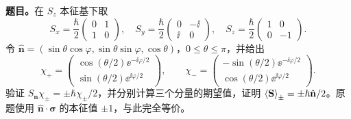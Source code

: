 \textbf{题目。}在 $S_z$ 本征基下取
\begin{equation}
  S_x=\frac\hbar2\begin{pmatrix}0&1\\1&0\end{pmatrix},\quad
  S_y=\frac\hbar2\begin{pmatrix}0&-\ii\\\ii&0\end{pmatrix},\quad
  S_z=\frac\hbar2\begin{pmatrix}1&0\\0&-1\end{pmatrix}.
\end{equation}
令 $\hat{\mathbf n}=(\sin\theta\cos\varphi,\sin\theta\sin\varphi,\cos\theta)$，$0\le\theta\le\pi$，并给出
\begin{equation}
  \chi_+=\begin{pmatrix}\cos(\theta/2)\ee^{-\ii\varphi/2}\\
      \sin(\theta/2)\ee^{\ii\varphi/2}\end{pmatrix},\qquad
  \chi_-=\begin{pmatrix}-\sin(\theta/2)\ee^{-\ii\varphi/2}\\
      \cos(\theta/2)\ee^{\ii\varphi/2}\end{pmatrix}.
\end{equation}
验证 $S_{\mathbf n}\chi_\pm=\pm\hbar\chi_\pm/2$，并分别计算三个分量的期望值，证明 $\left\langle \mathbf S \right\rangle_\pm=\pm\hbar\hat{\mathbf n}/2$。原题使用 $\hat{\mathbf n}\cdot\boldsymbol\sigma$ 的本征值 $\pm1$，与此完全等价。

